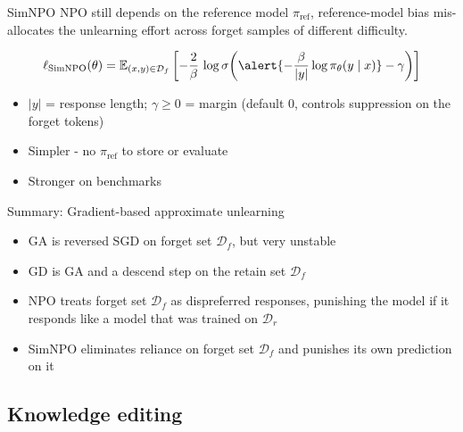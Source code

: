 \documentclass[12pt,aspectratio=169,handout]{beamer}
\begin{document}
\begin{frame}{SimNPO}
NPO still depends on the reference model $\pi_{\text{ref}}$, reference-model bias mis-allocates the unlearning effort across
forget samples of different difficulty.
 

\[
    \ell_{\text{SimNPO}}(\theta)
    = \mathbb{E}_{(x,y)\in\mathcal{D}_f}
    \left[ -\frac{2}{\beta}\, \log \sigma\!\left(
    \alert{-\frac{\beta}{|y|}\log \pi_\theta(y \mid x)} - \gamma
    \right)\right]
\]


\begin{itemize}
    \item $|y|$ = response length; $\gamma \ge 0$ = margin (default $0$, controls suppression on the forget tokens)
    \item Simpler - no $\pi_{\text{ref}}$ to store or evaluate
    \item Stronger on benchmarks
\end{itemize}
  
\end{frame}

\begin{frame}{Summary: Gradient-based approximate unlearning}
\begin{itemize}
    \item GA is reversed SGD on forget set $\mathcal{D}_f$, but very unstable
    \item GD is GA and a descend step on the retain set $\mathcal{D}_f$  \item NPO treats forget set $\mathcal{D}_f$ as dispreferred responses, punishing the model if it responds like a model that was trained on $\mathcal{D}_r$
    \item SimNPO eliminates reliance on forget set $\mathcal{D}_f$ and punishes its own prediction on it    
\end{itemize}    
\end{frame}

\subsection{Knowledge editing}
\end{document}

